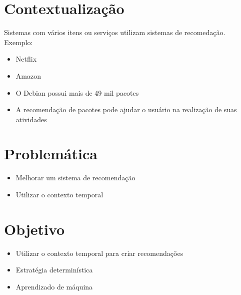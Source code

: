 \section{Contextualização} %
\label{sec:contextualizacao}

\begin{frame}
    Sistemas com vários itens ou serviços utilizam sistemas
de recomedação. Exemplo:
    \begin{itemize}
        \item Netflix
        \item Amazon
    \end{itemize}
\end{frame}

\begin{frame}
    \begin{itemize}
        \item O Debian possui mais de 49 mil pacotes
        \item A recomendação de pacotes pode ajudar o usuário
        na realização de suas atividades
    \end{itemize}
\end{frame}


\section{Problemática} %
\label{sec:problematica}

\begin{frame}
  \begin{itemize}
    \item Melhorar um sistema de recomendação
    \item Utilizar o contexto temporal
  \end{itemize}
\end{frame}


\section{Objetivo} %
\label{sec:objetivo}

\begin{frame}
  \begin{itemize}
    \item Utilizar o contexto temporal para criar recomendações
    \item Estratégia determinística
    \item Aprendizado de máquina
  \end{itemize}
\end{frame}

